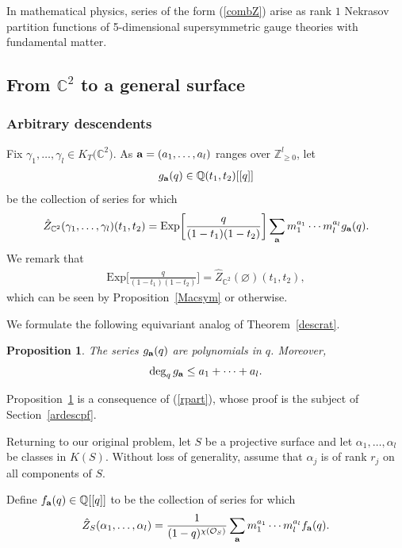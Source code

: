 \documentclass[10pt,a4paper]{amsart}
\newtheorem{Proposition}[Theorem]{Proposition}
 { \theoremstyle{definition}
\newtheorem{Definition}[Theorem]{Definition}
\newtheorem{Note}[Theorem]{Note}
\newtheorem{Example}[Theorem]{Example}
\newtheorem{Remark}[Theorem]{Remark} }
\numberwithin{equation}{section}
\newcommand{\Exp}{\mathrm{Exp}}
\def\O{\mathcal{O}}
\def\C{\mathbb C}
\def\Q{\mathbb Q}
\def\Z{\mathbb Z}
\begin{document}
In mathematical physics, series of the form (\ref{combZ}) arise as rank $1$ Nekrasov partition functions of 5-dimensional supersymmetric gauge theories with fundamental matter.

\subsection[From C\textasciicircum{}2 to a general surface]{From $\mathbb{C}^2$ to a general surface}

\subsubsection{Arbitrary descendents}\label{arbitrary}

Fix $\gamma_1,\dots,\gamma_l\in K_T\big(\C^2\big)$. As ${\bf a}=(a_1,\dots,a_l)$ ranges over $\Z_{\geq 0}^{l}$, let
\begin{gather*}
g_{{\bf a}}(q)\in \Q(t_1,t_2)[[q]]
\end{gather*}
be the collection of series for which
\begin{align}\label{gdef} \hat{Z}_{\C^2}(\gamma_1,\dots,\gamma_l)(t_1,t_2)=\Exp\bigg[\frac{q}{(1-t_1)(1-t_2)}\bigg] \sum_{\bf{a}}m_1^{a_1}\cdots m_l^{a_l} g_{\bf{a}}(q).
\end{align}
We remark that
\begin{gather*}
\Exp\bigg[\frac{q}{(1-t_1)(1-t_2)}\bigg]=\hat{Z}_{\C^2}(\varnothing)(t_1,t_2),
\end{gather*}
which can be seen by Proposition~\ref{Macsym} or otherwise.

We formulate the following equivariant analog of Theorem~\ref{descrat}.

\begin{Proposition}\label{equivdesc}
The series $g_{{\bf a}}(q)$ are polynomials in $q$. Moreover,
\begin{gather*}
\deg_{q} g_{\bf{a}}\leq a_1+\dots+a_l.
\end{gather*}
\end{Proposition}
Proposition~\ref{equivdesc} is a consequence of (\ref{rpart}), whose proof is the subject of Section~\ref{ardescpf}.

Returning to our original problem, let $S$ be a projective surface and let $\alpha_1,\dots,\alpha_l$ be classes in $K(S)$. Without loss of generality, assume that $\alpha_j$ is of rank $r_j$ on all components of $S$.

Define $f_{{\bf a}}(q)\in \Q[[q]]$ to be the collection of series for which
 \begin{gather} \label{projser}
\hat{Z}_S(\alpha_1,\dots,\alpha_l)=\frac{1}{(1-q)^{\chi(\O_S)}}\sum_{{\bf a}} m_1^{a_1}\cdots m_l^{a_l} f_{{\bf a}}(q).\end{gather}
\end{document}
